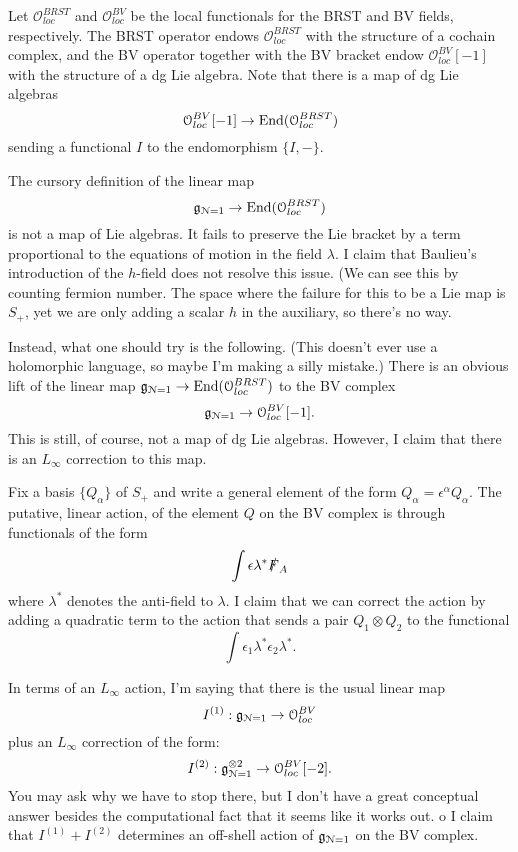 \documentclass[10pt, oneside]{article}
\begin{document}
\def\oloc{\mathcal{O}_{loc}}

Let $\oloc^{BRST}$ and $\oloc^{BV}$ be the local functionals for the BRST and BV fields, respectively. 
The BRST operator endows $\oloc^{BRST}$ with the structure of a cochain complex, and the BV operator together with the BV bracket endow $\oloc^{BV}[-1]$ with the structure of a dg Lie algebra. 
Note that there is a map of dg Lie algebras
\[
\oloc^{BV}[-1] \to {\rm End}(\oloc^{BRST})
\]
sending a functional $I$ to the endomorphism $\{I,-\}$.

\def\cN{\mathcal{N}}

The cursory definition of the linear map
\[
\mf g_{\cN=1} \to {\rm End}(\oloc^{BRST})
\]
is not a map of Lie algebras. 
It fails to preserve the Lie bracket by a term proportional to the equations of motion in the field $\lambda$. 
I claim that Baulieu's introduction of the $h$-field does not resolve this issue. (We can see this by counting fermion number. 
The space where the failure for this to be a Lie map is $S_+$, yet we are only adding a scalar $h$ in the auxiliary, so there's no way.

Instead, what one should try is the following. 
(This doesn't ever use a holomorphic language, so maybe I'm making a silly mistake.)
There is an obvious lift of the linear map $\mf g_{\cN=1} \to {\rm End}(\oloc^{BRST})$ to the BV complex
\[
\mf g_{\cN=1} \to \oloc^{BV} [-1] .
\]
This is still, of course, not a map of dg Lie algebras.
However, I claim that there is an $L_\infty$ correction to this map. 

Fix a basis $\{Q_\alpha\}$ of $S_+$ and write a general element of the form $Q_{\alpha} = \epsilon^\alpha Q_\alpha$.
The putative, linear action, of the element $Q$ on the BV complex is through functionals of the form
\[
\int \epsilon \lambda^* \slashed{F}_A 
\]
where $\lambda^*$ denotes the anti-field to $\lambda$. 
I claim that we can correct the action by adding a quadratic term to the action that sends a pair $Q_1 \otimes Q_2$ to the functional
\[
\int \epsilon_1 \lambda^* \epsilon_2 \lambda^*  .
\] 

In terms of an $L_\infty$ action, I'm saying that there is the usual linear map
\[
I^{(1)} : \mf g_{\cN=1} \to \oloc^{BV} 
\]
plus an $L_\infty$ correction of the form:
\[
I^{(2)} : \mf g_{\cN=1}^{\otimes 2} \to \oloc^{BV} [-2]  .
\]
You may ask why we have to stop there, but I don't have a great conceptual answer besides the computational fact that it seems like it works out. o
I claim that $I^{(1)} + I^{(2)}$ determines an off-shell action of $\mf g_{\cN=1}$ on the BV complex. 
\end{document}
